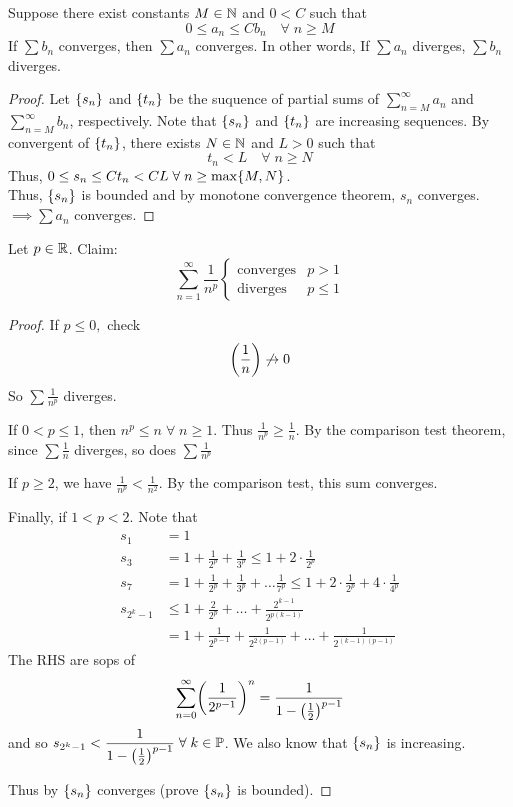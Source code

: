 \begin{thm} \label{thm:series:comparison}
    Suppose there exist constants $M \in \mathbb{N}$ and $0 < C$ such that \[
        0 \leq a_{n} \leq C b_{n} \quad\forall\; n \geq M
    \] If $\sum b_{n}$ converges, then $\sum a_{n}$ converges. In other words, If $\sum a_{n}$ diverges, $\sum b_{n}$ diverges.
\end{thm}
\begin{proof}
Let $\set{s_{n}}$ and $\set{t_{n}}$ be the suquence of partial sums of $\sum_{n=M}^{\infty} a_{n}$ and $\sum_{n=M}^{\infty} b_{n}$, respectively. Note that $\set{s_{n}}$ and $\set{t_{n}}$ are increasing sequences. By convergent of $\set{t_{n}}$, there exists $N \in\mathbb{N}$ and $L > 0$ such that \[
        t_{n} < L \quad \forall\; n \geq N
    \] Thus, $0 \leq s_{n} \leq Ct_{n} < CL \;\forall\; n \geq \max\set{M, N}$. \\
    Thus, $\set{s_{n}}$ is bounded and by monotone convergence theorem, $s_{n}$ converges. \\
    $\implies \sum a_{n}$ converges.
\end{proof}
\begin{example}
    Let $p \in \mathbb{R}$. Claim: \[
        \sum_{n=1}^{\infty} \frac{1}{n^{p}}
        \begin{cases}
            \text{converges} & p > 1 \\
            \text{diverges} & p \leq 1
        \end{cases}
    \]
\end{example}
\begin{proof}
    If $p \leq 0,$ check \[
        \paren{\frac{1}{n}} \not\to 0
    \] So $\sum \frac{1}{n^{p}}$ diverges.

    If $0 < p \leq 1$, then $n^{p} \leq n \;\forall\; n \geq 1$. Thus $\frac{1}{n^{p}} \geq \frac{1}{n}$. By the comparison test theorem, since $\sum \frac{1}{n}$ diverges, so does $\sum \frac{1}{n^{p}}$

    If $p \geq 2$, we have $\frac{1}{n^{p}} < \frac{1}{n^{2}}$. By the comparison test, this sum converges.

    Finally, if $1 < p < 2$. Note that
    \begin{align*}
        s_{1} &= 1 \\
        s_{3} &= 1 + \frac{1}{2^{p}} + \frac{1}{3^{p}} \leq 1 + 2 \cdot \frac{1}{2^{p}} \\
        s_{7} &= 1 + \frac{1}{2^{p}} + \frac{1}{3^{p}} + \dots \frac{1}{7^{p}} \leq 1 + 2\cdot \frac{1}{2^{p}} + 4 \cdot \frac{1}{4^{p}} \\
        s_{2^{k} - 1} &\leq 1 + \frac{2}{2^{p}} + \dots + \frac{2^{k-1}}{2^{p(k-1)}} \\
        &= 1 + \frac{1}{2^{p-1}} + \frac{1}{2^{2(p-1)}} + \dots + \frac{1}{2^{(k-1)(p-1)}}
    \end{align*}
    The RHS are sops of \[
        \sum_{n=0}^{\infty} \paren{\frac{1}{2^{p-1}}}^{n} = \frac{1}{1-\paren{\frac{1}{2}}^{p-1}}
    \] and so $s_{2^{k}-1} < \dfrac{1}{1-\paren{\frac{1}{2}}^{p-1}} \;\forall\; k \in \P$.
    We also know that $\set{s_{n}}$ is increasing.

    Thus by  $\set{s_{n}}$ converges (\textcolor{exercise}{prove $\set{s_{n}}$ is bounded}).
\end{proof}
